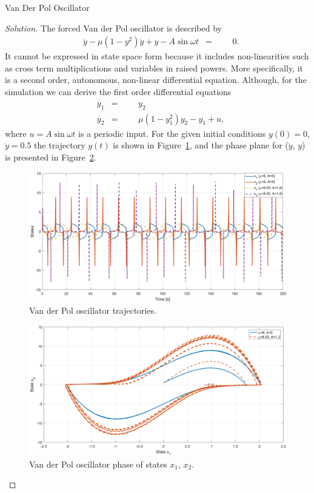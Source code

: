 \documentclass[12pt]{article}
\newenvironment{problem}[2][Problem]{\begin{trivlist}
\item[\hskip \labelsep {\bfseries #1}\hskip \labelsep {\bfseries #2.}]}{\end{trivlist}}
\newenvironment{solution}{\begin{proof}[Solution]}{\end{proof}}
\begin{document}
\begin{problem}{1.2} %
Van Der Pol Oscillator
\end{problem}
\begin{solution}
The forced Van der Pol oscillator is described by
\begin{equation}\label{eq_vdpSingle}
\begin{aligned}
& \ddot{y}-\mu (1-y^2)\dot{y}+y-A\sin{\omega t}
& =
&&& 0.
\end{aligned}
\end{equation}
It cannot be expressed in state space form because it includes non-linearities such as cross term multiplications and variables in raised powers. More specifically, it is a second order, autonomous, non-linear differential equation. Although, for the simulation we can derive the first order differential equations
\begin{equation}\label{eq_vdp}
\begin{aligned}
& \dot{y_1}
& =
&&& y_2\\
& \dot{y_2}
& =
&&& \mu(1-y_1^2)y_2-y_1+u,
\end{aligned}
\end{equation}
where $u=A\sin{\omega t}$ is a periodic input. For the given initial conditions $y(0)=0$, $\dot{y}=0.5$ the trajectory $y(t)$ is shown in Figure~\ref{fig_vdp}, and the phase plane for ($\dot{y}$, $y$) is presented in Figure~\ref{fig_vdpPhase}. 
\begin{figure}[!h]
	\includegraphics[width=.8\columnwidth]{figures/1_2_VanDerPol.png}
	\centering
	\caption{Van der Pol oscillator trajectories.}
	\label{fig_vdp}
\end{figure}
\begin{figure}[!h]
	\includegraphics[width=.8\columnwidth]{figures/1_2_VanDerPol_phase.png}
	\centering
	\caption{Van der Pol oscillator phase of states $x_1$, $x_2$.}
	\label{fig_vdpPhase}
\end{figure}

\end{solution}
\end{document}
